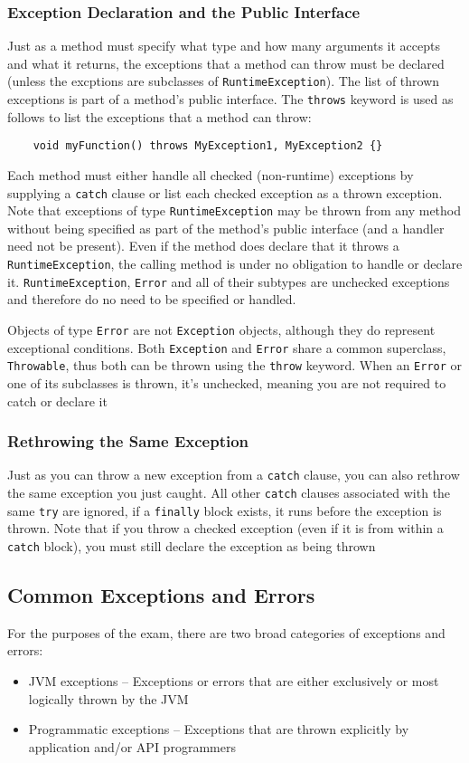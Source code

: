 \subsubsection{Exception Declaration and the Public Interface}
Just as a method must specify what type and how many arguments it accepts and 
what it returns, the exceptions that a method can throw must be declared 
(unless the excptions are subclasses of \verb#RuntimeException#). The list of 
thrown exceptions is part of a method's public interface. The \verb#throws# 
keyword is used as follows to list the exceptions that a method can throw:
\begin{verbatim}
    void myFunction() throws MyException1, MyException2 {}
\end{verbatim}
Each method must either handle all checked (non-runtime) exceptions by 
supplying a \verb#catch# clause or list each checked exception as a thrown 
exception. Note that exceptions of type \verb#RuntimeException# may be thrown 
from any method without being specified as part of the method's public 
interface (and a handler need not be present). Even if the method does declare 
that it throws a \verb#RuntimeException#, the calling method is under no 
obligation to handle or declare it. \verb#RuntimeException#, \verb#Error# and 
all of their subtypes are unchecked exceptions and therefore do no need to be 
specified or handled.

Objects of type \verb#Error# are not \verb#Exception# objects, although they do 
represent exceptional conditions. Both \verb#Exception# and \verb#Error# share 
a common superclass, \verb#Throwable#, thus both can be thrown using the 
\verb#throw# keyword. When an \verb#Error# or one of its subclasses is thrown, 
it's unchecked, meaning you are not required to catch or declare it

\subsubsection{Rethrowing the Same Exception}
Just as you can throw a new exception from a \verb#catch# clause, you can also 
rethrow the same exception you just caught. All other \verb#catch# clauses 
associated with the same \verb#try# are ignored, if a \verb#finally# block 
exists, it runs before the exception is thrown. Note that if you throw a 
checked exception (even if it is from within a \verb#catch# block), you must 
still declare the exception as being thrown

\subsection{Common Exceptions and Errors}
For the purposes of the exam, there are two broad categories of exceptions and 
errors:
\begin{itemize}
    \item JVM exceptions -- Exceptions or errors that are either exclusively or 
    most logically thrown by the JVM
    \item Programmatic exceptions -- Exceptions that are thrown explicitly by 
    application and/or API programmers
\end{itemize}

